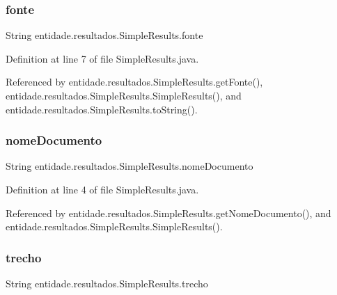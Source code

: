 \subsubsection{\texorpdfstring{fonte}{fonte}}
{\footnotesize\ttfamily String entidade.\+resultados.\+Simple\+Results.\+fonte\hspace{0.3cm}{\ttfamily [private]}}



Definition at line 7 of file Simple\+Results.\+java.



Referenced by entidade.\+resultados.\+Simple\+Results.\+get\+Fonte(), entidade.\+resultados.\+Simple\+Results.\+Simple\+Results(), and entidade.\+resultados.\+Simple\+Results.\+to\+String().

\hypertarget{classentidade_1_1resultados_1_1SimpleResults_a9dec340294219ec16a2e2b42e68ba350}{}\label{classentidade_1_1resultados_1_1SimpleResults_a9dec340294219ec16a2e2b42e68ba350} 
\subsubsection{\texorpdfstring{nome\+Documento}{nomeDocumento}}
{\footnotesize\ttfamily String entidade.\+resultados.\+Simple\+Results.\+nome\+Documento\hspace{0.3cm}{\ttfamily [private]}}



Definition at line 4 of file Simple\+Results.\+java.



Referenced by entidade.\+resultados.\+Simple\+Results.\+get\+Nome\+Documento(), and entidade.\+resultados.\+Simple\+Results.\+Simple\+Results().

\hypertarget{classentidade_1_1resultados_1_1SimpleResults_a94e8f77e73a35a3a544f30de1d4fa5b6}{}\label{classentidade_1_1resultados_1_1SimpleResults_a94e8f77e73a35a3a544f30de1d4fa5b6} 
\subsubsection{\texorpdfstring{trecho}{trecho}}
{\footnotesize\ttfamily String entidade.\+resultados.\+Simple\+Results.\+trecho\hspace{0.3cm}{\ttfamily [private]}}



